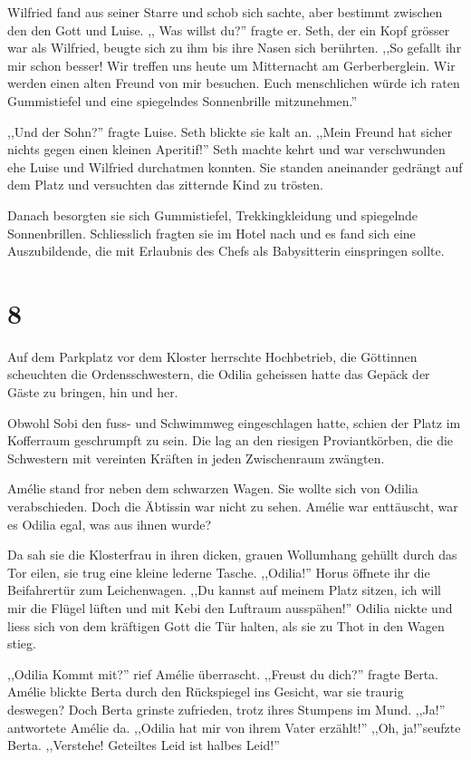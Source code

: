 Wilfried fand aus seiner Starre und schob sich sachte, aber bestimmt zwischen den den Gott und Luise. ,, Was willst du?'' fragte er. Seth, der ein Kopf grösser war als Wilfried, beugte sich zu ihm bis ihre Nasen sich berührten. ,,So gefallt ihr mir schon besser! Wir treffen uns heute um Mitternacht am Gerberberglein. Wir werden einen alten Freund von mir besuchen. Euch menschlichen würde ich raten Gummistiefel und eine spiegelndes Sonnenbrille mitzunehmen.''

,,Und der Sohn?'' fragte Luise. Seth blickte sie kalt an. ,,Mein  Freund hat sicher nichts gegen einen kleinen Aperitif!'' Seth machte kehrt und war verschwunden ehe Luise und Wilfried durchatmen konnten. Sie standen aneinander gedrängt auf dem Platz und versuchten das zitternde Kind zu trösten.

Danach besorgten sie sich Gummistiefel, Trekkingkleidung und spiegelnde Sonnenbrillen. Schliesslich fragten sie im Hotel nach und es fand sich eine Auszubildende, die mit Erlaubnis des Chefs als Babysitterin einspringen sollte.


\section*{8}


Auf dem Parkplatz vor dem Kloster herrschte Hochbetrieb, die Göttinnen scheuchten die Ordensschwestern, die Odilia geheissen hatte das Gepäck der Gäste zu bringen, hin und her.

Obwohl Sobi den fuss- und Schwimmweg eingeschlagen hatte, schien der Platz im Kofferraum geschrumpft zu sein. Die lag an den riesigen Proviantkörben, die die Schwestern mit  vereinten Kräften in jeden Zwischenraum zwängten. 

Amélie stand fror neben dem schwarzen Wagen. Sie wollte sich von Odilia verabschieden. Doch die Äbtissin war nicht zu sehen. Amélie war enttäuscht, war es Odilia egal, was aus ihnen wurde?

Da sah sie die Klosterfrau in ihren dicken, grauen Wollumhang gehüllt durch das Tor eilen, sie trug eine kleine lederne Tasche. ,,Odilia!'' Horus öffnete ihr die Beifahrertür zum Leichenwagen. ,,Du kannst auf meinem Platz sitzen, ich will mir die Flügel lüften und mit Kebi den Luftraum ausspähen!'' Odilia nickte und liess sich von dem kräftigen Gott die Tür halten, als sie zu Thot in den Wagen stieg.

,,Odilia Kommt mit?'' rief Amélie überrascht. ,,Freust du dich?'' fragte Berta. Amélie blickte Berta durch den Rückspiegel ins Gesicht, war sie traurig deswegen? Doch Berta grinste zufrieden, trotz ihres Stumpens im Mund. ,,Ja!'' antwortete Amélie da. ,,Odilia hat mir von ihrem Vater erzählt!'' ,,Oh, ja!''seufzte Berta. ,,Verstehe! Geteiltes Leid ist halbes Leid!''

